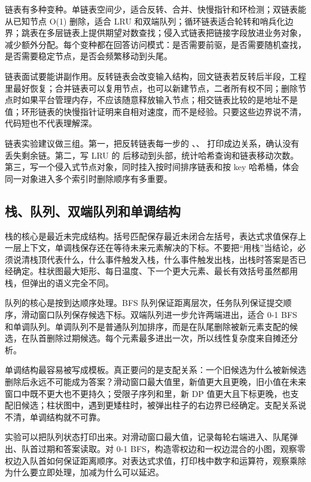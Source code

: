 链表有多种变种。单链表空间少，适合反转、合并、快慢指针和环检测；双链表能从已知节点 O(1) 删除，适合 LRU 和双端队列；循环链表适合轮转和哨兵化边界；跳表在多层链表上提供期望对数查找；侵入式链表把链接字段放进业务对象，减少额外分配。每个变种都在回答访问模式：是否需要前驱，是否需要随机查找，是否需要稳定节点，是否会频繁移动到头尾。

链表面试要能讲副作用。反转链表会改变输入结构，回文链表若反转后半段，工程里最好恢复；合并链表可以复用节点，也可以新建节点，二者所有权不同；删除节点时如果平台管理内存，不应该随意释放输入节点；相交链表比较的是地址不是值；环形链表的快慢指针证明来自相对速度，而不是经验。只要这些边界说不清，代码短也不代表理解深。

链表实验建议做三组。第一，把反转链表每一步的 、、 打印成边关系，确认没有丢失剩余链。第二，写 LRU 的  后移动到头部，统计哈希查询和链表移动次数。第三，写一个侵入式节点对象，同时挂入按时间排序链表和按 key 哈希桶，体会同一对象进入多个索引时删除顺序有多重要。

\subsection{栈、队列、双端队列和单调结构}

栈的核心是最近未完成结构。括号匹配保存最近未闭合左括号，表达式求值保存上一层上下文，单调栈保存还在等待未来元素解决的下标。不要把“用栈”当结论，必须说清栈顶代表什么，什么事件触发入栈，什么事件触发出栈，出栈时答案是否已经确定。柱状图最大矩形、每日温度、下一个更大元素、最长有效括号虽然都用栈，但弹出的语义完全不同。

队列的核心是按到达顺序处理。BFS 队列保证距离层次，任务队列保证提交顺序，滑动窗口队列保存候选下标。双端队列进一步允许两端进出，适合 0-1 BFS 和单调队列。单调队列不是普通队列加排序，而是在队尾删除被新元素支配的候选，在队首删除过期候选。每个元素最多进出一次，所以线性复杂度来自摊还分析。

单调结构最容易被写成模板。真正要问的是支配关系：一个旧候选为什么被新候选删除后永远不可能成为答案？滑动窗口最大值里，新值更大且更晚，旧小值在未来窗口中既不更大也不更持久；受限子序列和里，新 DP 值更大且下标更晚，也支配旧候选；柱状图中，遇到更矮柱时，被弹出柱子的右边界已经确定。支配关系说不清，单调结构就不可靠。

实验可以把队列状态打印出来。对滑动窗口最大值，记录每轮右端进入、队尾弹出、队首过期和答案读取。对 0-1 BFS，构造零权边和一权边混合的小图，观察零权边入队首如何保证距离顺序。对表达式求值，打印栈中数字和运算符，观察乘除为什么要立即处理，加减为什么可以延迟。

